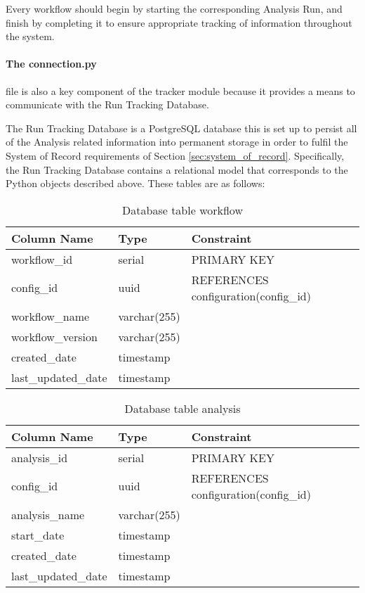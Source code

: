 Every workflow should begin by starting the corresponding Analysis Run, and finish by completing it to ensure appropriate tracking of information throughout the system.

\paragraph{The connection.py} file is also a key component of the tracker module because it provides a means to communicate with the Run Tracking Database.

The Run Tracking Database is a PostgreSQL database this is set up to persist all of the Analysis related information into permanent storage in order to fulfil the System of Record requirements of Section \ref{sec:system_of_record}. Specifically, the Run Tracking Database contains a relational model that corresponds to the Python objects described above. These tables are as follows:

\begin{table}[H]
\renewcommand{\arraystretch}{1.2} 
\centering
\begin{tabular}{@{}lll@{}}
\toprule
Column Name & Type & Constraint\\
\midrule
workflow\_id & serial & PRIMARY KEY\\
config\_id & uuid & REFERENCES configuration(config\_id)\\
workflow\_name & varchar(255) & \\
workflow\_version & varchar(255) & \\
created\_date & timestamp\\
last\_updated\_date & timestamp\\
\bottomrule
\end{tabular}
\caption{Database table workflow}
\end{table}

\begin{table}[H]
\renewcommand{\arraystretch}{1.2} 
\centering
\begin{tabular}{@{}lll@{}}
\toprule
Column Name & Type & Constraint\\
\midrule
analysis\_id & serial & PRIMARY KEY\\
config\_id & uuid & REFERENCES configuration(config\_id)\\
analysis\_name & varchar(255) & \\
start\_date & timestamp & \\
created\_date & timestamp\\
last\_updated\_date & timestamp\\
\bottomrule
\end{tabular}
\caption{Database table analysis}
\end{table}

